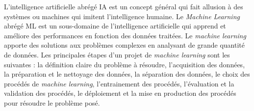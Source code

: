L'intelligence artificielle abrégé IA est un concept général qui fait allusion à des systèmes ou machines qui imitent l'intelligence humaine. Le \textit{Machine Learning} abrégé ML est un sous-domaine de l'intelligence artificielle qui apprend et améliore des performances en fonction des données traitées. Le \textit{machine learning } apporte des solutions aux problèmes complexes en analysant de grande quantité de données.
Les principales étapes d'un projet de \textit{machine learning} sont les suivantes : la définition claire du problème à résoudre, l'acquisition des données, la préparation et le nettoyage des données, la séparation des données, le choix des procédés de \textit{machine learning}, l'entrainement des procédés, l'évaluation  et la validation des procédés, le déploiement et la mise en \og production \fg{} des procédés pour résoudre le problème posé.
%
